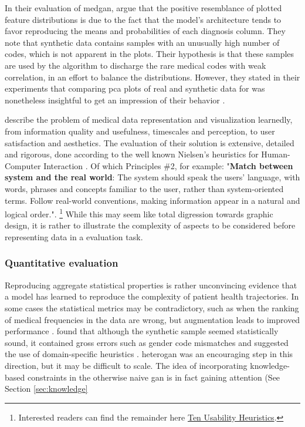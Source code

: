 In their evaluation of \gls{medgan}, \cite{yale:hal-02160496} argue that the positive resemblance of plotted feature distributions is due to the fact that the model's architecture tends to favor reproducing the means and probabilities of each diagnosis column. They note that synthetic data contains samples with an unusually high number of codes, which is not apparent in the plots. Their hypothesis is that these samples are used by the algorithm to discharge the rare medical codes with weak correlation, in an effort to balance the distributions. However, they stated in their experiments that comparing \gls{pca} plots of real and synthetic data for was nonetheless insightful to get an impression of their behavior \cite{Yale_2020}.\par

\citeauthor{Ledesma2016-hn} describe the problem of medical data representation and visualization learnedly, from information quality and usefulness, timescales and perception, to user satisfaction and aesthetics. The evaluation of their solution is extensive, detailed and rigorous, done according to the well known Nielsen's heuristics for Human-Computer Interaction \cite{nielsend}. Of which Principles \#2, for example: "\textbf{Match between system and the real world}: The system should speak the users' language, with words, phrases and concepts familiar to the user, rather than system-oriented terms. Follow real-world conventions, making information appear in a natural and logical order.". \footnote{Interested readers can find the remainder here \href{https://www.nngroup.com/articles/ten-usability-heuristics/}{Ten Usability Heuristics}.} While this may seem like total digression towards graphic design, it is rather to illustrate the complexity of aspects to be considered before representing data in a evaluation task.

\subsubsection{Quantitative evaluation}
Reproducing aggregate statistical properties is rather unconvincing evidence that a model has learned to reproduce the complexity of patient health trajectories. In some cases the statistical metrics may be contradictory, such as when the ranking of medical frequencies in the data are wrong, but augmentation leads to improved performance \cite{Che_2017}. \citeauthor{Choi2017-nt} found that although the synthetic sample seemed statistically sound, it contained gross errors such as gender code mismatches and suggested the use of domain-specific heuristics \cite{Choi2017-nt}. \gls{heterogan} was an encouraging step in this direction, but it may be difficult to scale. The idea of incorporating knowledge-based constraints in the otherwise naive \gls{gan} is in fact gaining attention (See Section \ref{sec:knowledge} \par

